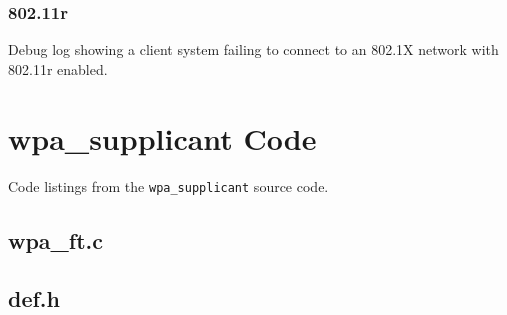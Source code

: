 \subsubsection{802.11r}
Debug log showing a client system failing to connect to an 802.1X network with 802.11r enabled.


\section{wpa\_supplicant Code}
Code listings from the \verb`wpa_supplicant` source code.
\subsection{wpa\_ft.c}

\subsection{def.h}
